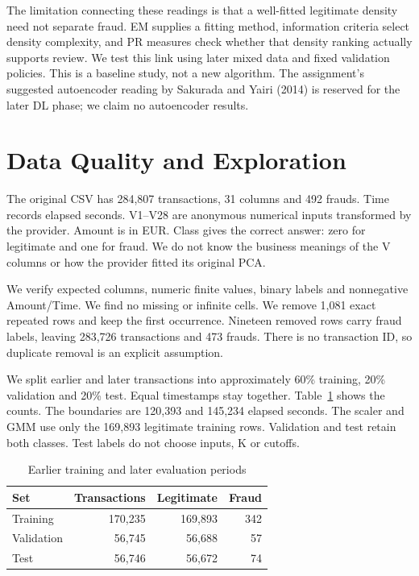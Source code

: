 \documentclass[conference]{IEEEtran}
\begin{document}
The limitation connecting these readings is that a well-fitted legitimate density need not separate fraud. EM supplies a fitting method, information criteria select density complexity, and PR measures check whether that density ranking actually supports review. We test this link using later mixed data and fixed validation policies. This is a baseline study, not a new algorithm. The assignment's suggested autoencoder reading by Sakurada and Yairi (2014) is reserved for the later DL phase; we claim no autoencoder results.

\section{Data Quality and Exploration}
The original CSV has 284,807 transactions, 31 columns and 492 frauds. Time records elapsed seconds. V1--V28 are anonymous numerical inputs transformed by the provider. Amount is in EUR. Class gives the correct answer: zero for legitimate and one for fraud. We do not know the business meanings of the V columns or how the provider fitted its original PCA.

We verify expected columns, numeric finite values, binary labels and nonnegative Amount/Time. We find no missing or infinite cells. We remove 1,081 exact repeated rows and keep the first occurrence. Nineteen removed rows carry fraud labels, leaving 283,726 transactions and 473 frauds. There is no transaction ID, so duplicate removal is an explicit assumption.

We split earlier and later transactions into approximately 60\% training, 20\% validation and 20\% test. Equal timestamps stay together. Table~\ref{tab:split} shows the counts. The boundaries are 120,393 and 145,234 elapsed seconds. The scaler and GMM use only the 169,893 legitimate training rows. Validation and test retain both classes. Test labels do not choose inputs, K or cutoffs.
\begin{table}[!t]\centering\caption{Earlier training and later evaluation periods}\label{tab:split}
\begin{tabular}{lrrr}\hline
Set & Transactions & Legitimate & Fraud\\\hline
Training & 170,235 & 169,893 & 342\\
Validation & 56,745 & 56,688 & 57\\
Test & 56,746 & 56,672 & 74\\
\hline\end{tabular}\end{table}
\end{document}
